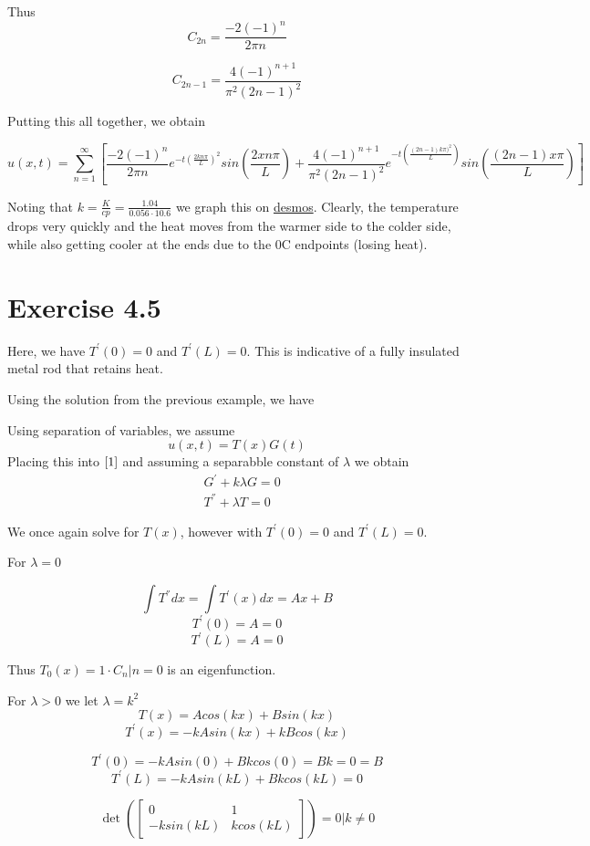 \documentclass{article}
\begin{document}
Thus
$$C_{2n} = \frac{-2 (-1)^n}{2\pi n}$$

$$C_{2n-1} = \frac{ 4(-1)^{n+1}}{\pi^2(2n-1)^2}$$

Putting this all together, we obtain

$$u(x,t) = \sum_{n=1}^{\infty} \left[ \frac{-2(-1)^n}{2\pi n} e^{-t\left(\frac{2kn\pi}{L}\right)^2} sin\left(\frac{2xn\pi}{L}\right) + \frac{4\left(-1\right)^{n+1}}{\pi^2 (2n-1)^2} e^{-t\left(\frac{(2n-1)k\pi)^2}{L}\right)} sin\left(\frac{(2n-1)x\pi}{L}\right)\right]$$

Noting that $k=\frac{K}{cp} = \frac{1.04}{0.056 \cdot 10.6}$ we graph this on \href{https://www.desmos.com/calculator/aoywxidecv}{desmos}. Clearly, the temperature drops very quickly and the heat moves from the warmer side to the colder side, while also getting cooler at the ends due to the 0C endpoints (losing heat).

\section*{Exercise 4.5}

Here, we have $T^{'}(0)=0$ and $T^{'}(L)=0$. This is indicative of a fully insulated metal rod that retains heat.

Using the solution from the previous example, we have

Using separation of variables, we assume
\begin{equation}\label{3}
u(x,t) = T(x)G(t)
\end{equation}
Placing this into $\eqref{1}$ and assuming a separabble constant of $\lambda$ we obtain
\begin{align*}
&G^{'} + k\lambda G = 0\\
&T^{''} + \lambda T =0
\end{align*}

We once again solve for $T(x)$, however with $T^{'}(0)=0$ and $T^{'}(L)=0$.

For $\lambda = 0$

$$\int T^{''} dx = \int T^{'}(x) dx  = Ax +B$$
$$T^{'}(0) = A = 0$$
$$T^{'}(L) = A = 0$$

Thus $T_0(x) = 1 \cdot C_n\Bigr|n=0$ is an eigenfunction.


For $\lambda > 0$ we let $\lambda = k^2$
$$T(x) = Acos(k x) + Bsin(k x)$$
$$T^{'}(x) = -kAsin(kx)+kBcos(kx)$$

$$T^{'}(0) = -kAsin(0)+Bkcos(0) = Bk = 0 = B$$
$$T^{'}(L) = -kAsin(kL)+Bkcos(kL) = 0$$

$$\det \left( \begin{bmatrix} 0 & 1 \\ -ksin(kL) & kcos(kL) \end{bmatrix} \right) = 0 \Bigr| k \neq 0 $$
\end{document}
